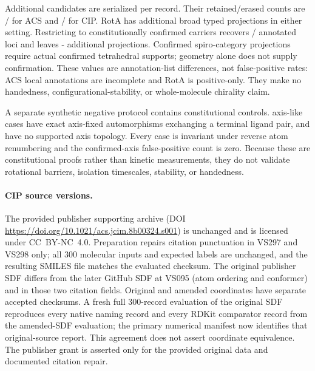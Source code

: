 \documentclass[pdflatex,sn-mathphys-num,referee,lineno]{sn-jnl}
\newcommand{\RotAConfirmedAdditional}{\the\numexpr\RotAConfirmedPredicted-\RotAConfirmedRecovered\relax}
\theoremstyle{plain}
\theoremstyle{remark}
\theoremstyle{definition}
\begin{document}
Additional candidates are serialized per record.  Their retained/erased
counts are \AcsRetainedAdditional/\AcsErasedAdditional{} for ACS and \CipRetainedAdditional/\CipErasedAdditional{} for CIP. RotA has \RotAErasedAdditional{} additional
broad typed projections in either setting. Restricting to constitutionally
confirmed carriers recovers \RotAConfirmedRecovered/\RotAReferenceLoci{}
annotated loci and leaves \RotAConfirmedAdditional{} additional projections.
Confirmed spiro-category projections require actual confirmed tetrahedral
supports; geometry alone does not supply confirmation. These values are annotation-list
differences, not false-positive rates: ACS local annotations are incomplete
and RotA is positive-only.  They make no handedness, configurational-stability,
or whole-molecule chirality claim.

A separate synthetic negative protocol contains \SyntheticAxisNegatives{} constitutional controls.
\SyntheticAxisWitnessNegatives{} axis-like cases have exact axis-fixed automorphisms exchanging a
terminal ligand pair, and \SyntheticAxisNoSupportNegatives{} have no supported axis topology. Every case
is invariant under reverse atom renumbering and the confirmed-axis
false-positive count is zero.  Because these are constitutional proofs rather
than kinetic measurements, they do not validate rotational barriers,
isolation timescales, stability, or handedness.

\paragraph{CIP source versions.}
The provided publisher supporting archive (DOI
\url{https://doi.org/10.1021/acs.jcim.8b00324.s001}) is unchanged and is
licensed under CC~BY-NC~4.0. Preparation repairs citation punctuation in
VS297 and VS298 only; all 300 molecular inputs and expected labels are
unchanged, and the resulting SMILES file matches the evaluated checksum.
The original publisher SDF differs from the later GitHub SDF at VS095
(atom ordering and conformer) and in those two citation fields.
Original and amended coordinates have separate accepted checksums. A fresh
full 300-record evaluation of the original SDF reproduces every native naming
record and every RDKit comparator record from the amended-SDF evaluation;
the primary numerical manifest now identifies that original-source report.
This agreement does not assert coordinate equivalence. The publisher grant
is asserted only for the
provided original data and documented citation repair.
\end{document}

